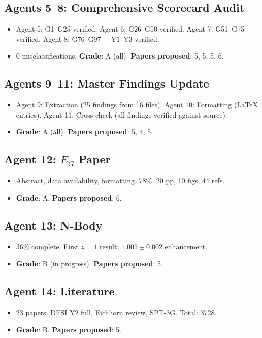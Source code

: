 \documentclass[11pt,a4paper]{article}
\begin{document}
\subsection{Agents 5--8: Comprehensive Scorecard Audit}
\begin{itemize}[nosep]
\item Agent 5: G1--G25 verified. Agent 6: G26--G50 verified. Agent 7: G51--G75 verified. Agent 8: G76--G97 + Y1--Y3 verified.
\item 0 misclassifications. \textbf{Grade}: A (all). \textbf{Papers proposed}: 5, 5, 5, 6.
\end{itemize}

\subsection{Agents 9--11: Master Findings Update}
\begin{itemize}[nosep]
\item Agent 9: Extraction (25 findings from 16 files). Agent 10: Formatting (LaTeX entries). Agent 11: Cross-check (all findings verified against source).
\item \textbf{Grade}: A (all). \textbf{Papers proposed}: 5, 4, 5.
\end{itemize}

\subsection{Agent 12: $E_G$ Paper}
\begin{itemize}[nosep]
\item Abstract, data availability, formatting. 78\%. 20 pp, 10 figs, 44 refs.
\item \textbf{Grade}: A. \textbf{Papers proposed}: 6.
\end{itemize}

\subsection{Agent 13: N-Body}
\begin{itemize}[nosep]
\item 36\% complete. First $z = 1$ result: $1.005 \pm 0.002$ enhancement.
\item \textbf{Grade}: B (in progress). \textbf{Papers proposed}: 5.
\end{itemize}

\subsection{Agent 14: Literature}
\begin{itemize}[nosep]
\item 23 papers. DESI Y2 full, Eichhorn review, SPT-3G. Total: 3728.
\item \textbf{Grade}: B. \textbf{Papers proposed}: 5.
\end{itemize}
\end{document}
